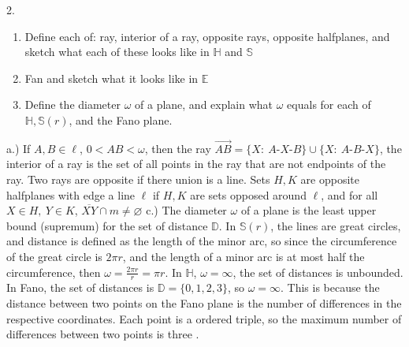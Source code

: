 \documentclass{report}
\begin{document}
    \bigbreak \noindent 
    \begin{mdframed}
        2. 
        \begin{enumerate}[label=(\alph*)]
            \item Define each of: ray, interior of a ray, opposite rays, opposite halfplanes, and sketch what each of these looks like in $\mathbb{H}$ and $\mathbb{S}$
            \item Fan and sketch what it looks like in $\mathbb{E}$ 
            \item Define the diameter $\omega$ of a plane, and explain what $\omega$ equals for each of $\mathbb{H}, \mathbb{S}(r)$, and the Fano plane.
        \end{enumerate}
    \end{mdframed}
    \bigbreak \noindent 
    a.) If $A,B\in \ell$, $ 0 < AB < \omega$, then the ray $\overrightarrow{AB} = \{X:\ A\text{-}X\text{-}B\} \cup \{X:\ A\text{-}B\text{-}X\} $, the interior of a ray is the set of all points in the ray that are not endpoints of the ray.
    \bigbreak \noindent 
    Two rays are opposite if there union is a line. Sets $H,K$ are opposite halfplanes with edge a line $\ell$ if $H,K$ are sets opposed around $\ell$, and for all $X \in H,\ Y \in K$, $\overline{XY} \cap m \ne \varnothing$
    \bigbreak \noindent 
    c.) The diameter $\omega$ of a plane is the least upper bound (supremum) for the set of distance $\mathbb{D}$. In $\mathbb{S}(r)$, the lines are great circles, and distance is defined as the length of the minor arc, so since the circumference of the great circle is $2\pi r$, and the length of a minor arc is at most half the circumference, then $\omega = \frac{2\pi r}{r} = \pi r$. In $\mathbb{H}$, $\omega = \infty$, the set of distances is unbounded.
    \bigbreak \noindent 
    In Fano, the set of distances is $\mathbb{D} = \{0,1,2,3\}$, so $\omega =\infty$. This is because the distance between two points on the Fano plane is the number of differences in the respective coordinates. Each point is a ordered triple, so the maximum number of differences between two points is three .
\end{document}
